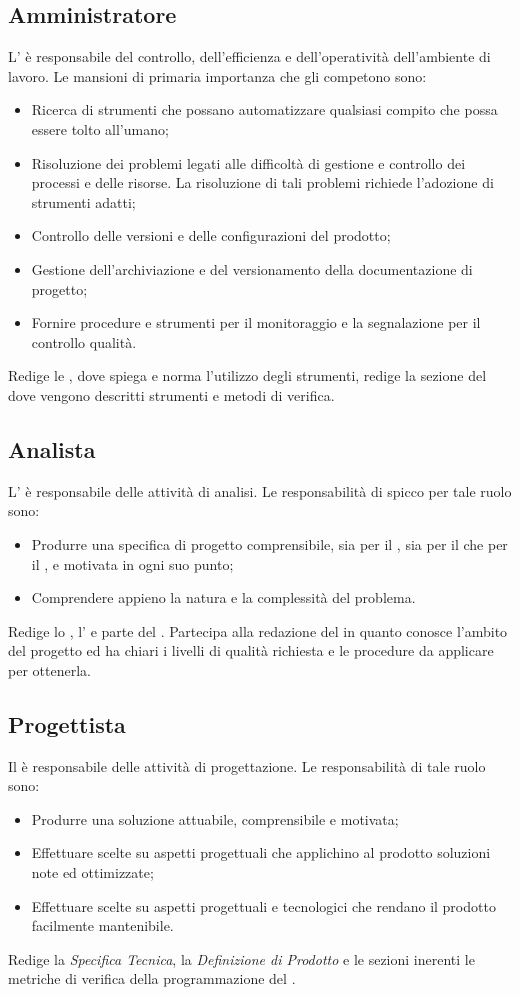 \documentclass[12pt,a4paper]{article}
\begin{document}
\subsection{Amministratore}
L'\AM{} è responsabile del controllo, dell'efficienza e dell'operatività dell'ambiente di lavoro. Le mansioni di primaria importanza che gli competono sono:
\begin{itemize}
	\item Ricerca di strumenti che possano automatizzare qualsiasi compito che possa essere tolto all'umano;
	\item Risoluzione dei problemi legati alle difficoltà di gestione e controllo dei processi e delle risorse. La risoluzione di tali problemi richiede l'adozione di strumenti adatti;
	\item Controllo delle versioni e delle configurazioni del prodotto;
	\item Gestione dell'archiviazione e del versionamento della documentazione di progetto;
	\item Fornire procedure e strumenti per il monitoraggio e la segnalazione per il controllo qualità.
\end{itemize}
Redige le \NdP{}, dove spiega e norma l'utilizzo degli strumenti, redige la sezione del \PdQ{} dove vengono descritti strumenti e metodi di verifica.

\subsection{Analista}
L'\AN{} è responsabile delle attività di analisi. Le responsabilità di spicco per tale ruolo sono:
\begin{itemize}
	\item Produrre una specifica di progetto comprensibile, sia per il , sia per il  che per il \PG{}, e motivata in ogni suo punto;
	\item Comprendere appieno la natura e la complessità del problema.
\end{itemize}
Redige lo \SdF{}, l'\AdR{} e parte del \PdQ{}.
Partecipa alla redazione del \PdQ{} in quanto conosce l'ambito del progetto ed ha chiari i livelli di qualità richiesta e le procedure da applicare per ottenerla.

\subsection{Progettista}
Il \PG{} è responsabile delle attività di progettazione. Le responsabilità di tale
ruolo sono:
\begin{itemize}
	\item Produrre una soluzione attuabile, comprensibile e motivata;
	\item Effettuare scelte su aspetti progettuali che applichino al prodotto soluzioni note ed ottimizzate;
	\item Effettuare scelte su aspetti progettuali e tecnologici che rendano il prodotto facilmente mantenibile.
\end{itemize}
Redige la \textit{Specifica Tecnica}, la \textit{Definizione di Prodotto} e le sezioni inerenti le metriche di verifica della programmazione del \PdQ{}.
\end{document}
